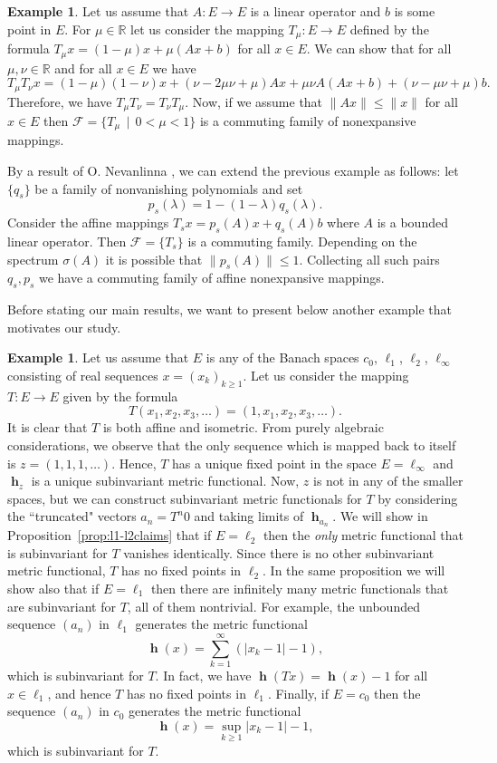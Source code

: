 \documentclass[a4paper,12pt]{article}
\theoremstyle{definition}
\newtheorem{example}[theorem]{Example}
\numberwithin{equation}{section}
\newcommand{\abs}[1]{\lvert#1\rvert} %
\newcommand{\norm}[1]{\lVert#1\rVert} %
\newcommand{\R}{\mathbb{R}}  %
\newcommand{\F}{\mathcal{F}} %
\numberwithin{equation}{section}
\DeclareMathOperator{\h}{\mathbf{h}} %
\begin{document}
\begin{example}
Let us assume that $A:E\to E$ is a 
linear operator and $b$ is some point in $E$. 
For $\mu\in \R$ let us consider the mapping 
$T_\mu : E\to E$ defined by the formula 
$T_\mu x = (1 - \mu)x + \mu(Ax + b)$ for all
$x \in E$. We can show that for all 
$\mu,\nu \in \R$ and for all $x \in E$ we have
$$
T_{\mu}T_{\nu}x = (1 - \mu)(1 - \nu)x 
    + (\nu - 2\mu \nu + \mu)Ax 
    + \mu \nu A(Ax + b) + (\nu - \mu \nu + \mu)b.
$$
Therefore, we have 
$T_\mu T_\nu = T_\nu T_\mu$. Now, if we 
assume that $\norm{Ax}\leq \norm{x}$ for all 
$ x\in E$ then 
$\F = \{ T_\mu\,\mid\,0 < \mu < 1 \}$ is a 
commuting family of nonexpansive mappings. 

By a result of O. Nevanlinna 
\cite[Proposition~1.4.2]{ONevanlinna1993},
we can extend the previous example as 
follows: let $\{q_s\}$ be a family of 
nonvanishing polynomials and set 
$$
p_s (\lambda) = 1 - (1 - \lambda)q_s (\lambda).
$$ 
Consider the affine mappings 
$T_s x = p_s(A) x + q_s(A)b$ where $A$ is a 
bounded linear operator. Then 
$\mathcal F=\{T_s\}$ is a commuting family. 
Depending on the spectrum $\sigma(A)$ it is 
possible that $\norm{p_s(A)} \leq 1$. 
Collecting all such pairs $q_s, p_s$ we have 
a commuting family of affine nonexpansive 
mappings.  
\end{example}

Before stating our main results, we want to
present below another example that motivates 
our study.  

\begin{example}\label{ex:1}
Let us assume that $E$ is any of the Banach 
spaces $c_0$, $\ell_1$, $\ell_2$, 
$\ell_\infty$ consisting of real sequences
$x = (x_k)_{k\geq 1}$. Let us consider the 
mapping $T: E\to E$ given by the formula
$$
T(x_1, x_2, x_3,\dots) 
    = (1, x_1, x_2, x_3,\dots ).
$$
It is clear that $T$ is both affine and 
isometric. From purely algebraic 
considerations, we observe that the only 
sequence which is mapped back to itself is 
$z=(1,1,1, \dots)$. Hence, $T$ has a unique 
fixed point in the space $E=\ell_\infty$ and 
$\h_z$ is a unique subinvariant metric 
functional. Now, $z$ is not in any of the 
smaller spaces, but we can construct 
subinvariant metric functionals for $T$ by 
considering the ``truncated" vectors 
$a_n=T^n0$ and taking limits of $\h_{a_n}$.
We will show in 
Proposition~\ref{prop:l1-l2claims} that if 
$E=\ell_2$ then the \emph{only} metric 
functional that is subinvariant for $T$ 
vanishes identically. Since there is no other 
subinvariant metric functional, $T$ has no 
fixed points in $\ell_2$. In the same 
proposition we will show also that if 
$E= \ell_1$ then there are infinitely many 
metric functionals that are subinvariant for 
$T$, all of them nontrivial. For example, the 
unbounded sequence $(a_n)$ in $\ell_1$ 
generates the metric functional
$$
\h(x) = \sum_{k=1}^\infty (\abs{x_k - 1} -1),  
$$ 
which is subinvariant for $T$. In fact, we 
have $\h(Tx) = \h(x) - 1$ for all 
$x\in\ell_1$, and hence $T$ has no fixed 
points in $\ell_1$. Finally, if $E=c_0$ then 
the sequence $(a_n)$ in $c_0$ generates the 
metric functional 
$$
\h(x) = \sup_{k\ge 1} \abs{x_k - 1} - 1,
$$ 
which is subinvariant for $T$.
\end{example}   
    
\end{document}
